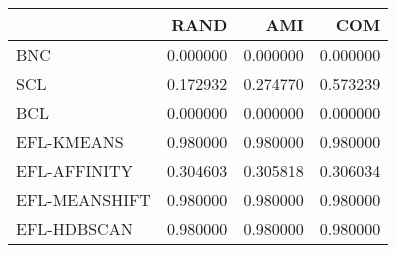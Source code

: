 \begin{tabular}{lrrr}
\toprule
 & RAND & AMI & COM \\
\midrule
BNC & 0.000000 & 0.000000 & 0.000000 \\
SCL & 0.172932 & 0.274770 & 0.573239 \\
BCL & 0.000000 & 0.000000 & 0.000000 \\
EFL-KMEANS & 0.980000 & 0.980000 & 0.980000 \\
EFL-AFFINITY & 0.304603 & 0.305818 & 0.306034 \\
EFL-MEANSHIFT & 0.980000 & 0.980000 & 0.980000 \\
EFL-HDBSCAN & 0.980000 & 0.980000 & 0.980000 \\
\bottomrule
\end{tabular}
